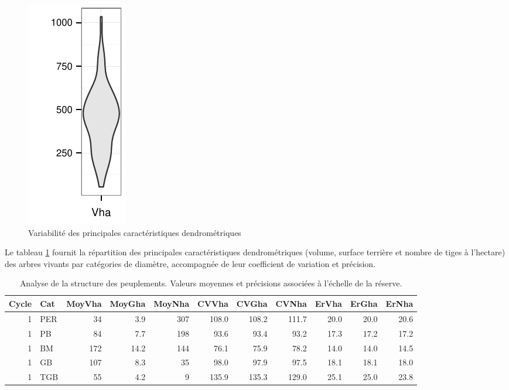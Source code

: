 \documentclass[a4paper]{book}\usepackage[]{graphicx}\usepackage[]{color}
\makeatletter
\def\maxwidth{ %
  \ifdim\Gin@nat@width>\linewidth
    \linewidth
  \else
    \Gin@nat@width
  \fi
}
\newenvironment{knitrout}{}{} %
\makeatother
\begin{document}
\begin{knitrout}
\begin{figure}[H]
{\includegraphics[width=\maxwidth]{Figures/GraphDendro-3} 

}

\caption[Variabilité des principales caractéristiques dendrométriques]{Variabilité des principales caractéristiques dendrométriques\label{fig:GraphDendro}}
\end{figure}


\end{knitrout}


Le tableau \ref{Structure} fournit la répartition des principales caractéristiques dendrométriques (volume, surface terrière et nombre de tiges à l'hectare) des arbres vivants par catégories de diamètre, accompagnée de leur coefficient de variation et précision.

\begin{table}[ht]
\centering
{\footnotesize
\begin{tabular}{rlrrrrrrrrr}
  \hline
Cycle & Cat & MoyVha & MoyGha & MoyNha & CVVha & CVGha & CVNha & ErVha & ErGha & ErNha \\ 
  \hline
1 & PER & 34 & 3.9 & 307 & 108.0 & 108.2 & 111.7 & 20.0 & 20.0 & 20.6 \\ 
  1 & PB & 84 & 7.7 & 198 & 93.6 & 93.4 & 93.2 & 17.3 & 17.2 & 17.2 \\ 
  1 & BM & 172 & 14.2 & 144 & 76.1 & 75.9 & 78.2 & 14.0 & 14.0 & 14.5 \\ 
  1 & GB & 107 & 8.3 & 35 & 98.0 & 97.9 & 97.5 & 18.1 & 18.1 & 18.0 \\ 
  1 & TGB & 55 & 4.2 & 9 & 135.9 & 135.3 & 129.0 & 25.1 & 25.0 & 23.8 \\ 
   \hline
\end{tabular}
}
\caption{Analyse de la structure des peuplements. Valeurs moyennes et précisions associées à l'échelle de la réserve.} 
\label{Structure}
\end{table}
\end{document}
